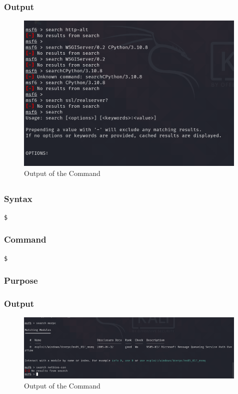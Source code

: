 \documentclass[11pt]{article}
\begin{document}
\subsubsection*{Output}
\begin{figure}[H]
    \centering
    \includegraphics[width=0.99\textwidth]{a3_ss (17).png}
    \caption{Output of the Command}
\end{figure}
\subsection{}

\subsubsection*{Syntax}
\begin{verbatim}
$
\end{verbatim}

\subsubsection*{Command}
\begin{verbatim}
$
\end{verbatim}

\subsubsection*{Purpose}

\subsubsection*{Output}
\begin{figure}[H]
    \centering
    \includegraphics[width=0.99\textwidth]{a3_ss (18).png}
    \caption{Output of the Command}
\end{figure}
\end{document}
